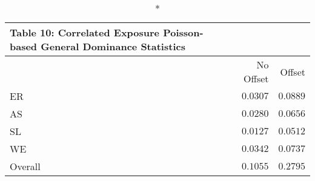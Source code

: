 \begin{longtable}{l|rr}
\caption*{
{\large Table 10: Correlated Exposure Poisson-based General Dominance Statistics}
} \\ 
\toprule
\multicolumn{1}{l}{} & No Offset & Offset \\ 
\midrule
ER & $0.0307$ & $0.0889$ \\ 
AS & $0.0280$ & $0.0656$ \\ 
SL & $0.0127$ & $0.0512$ \\ 
WE & $0.0342$ & $0.0737$ \\ 
Overall & $0.1055$ & $0.2795$ \\ 
\bottomrule
\end{longtable}

